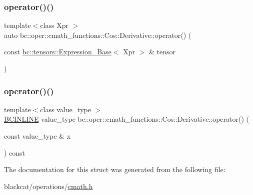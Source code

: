 \mbox{\label{structbc_1_1oper_1_1cmath__functions_1_1Cos_1_1Derivative_a5a9d6f6ab7a0dd71443573bbd4f87ba5}} 
\subsubsection{\texorpdfstring{operator()()}{operator()()}\hspace{0.1cm}{\footnotesize\ttfamily [2/3]}}
{\footnotesize\ttfamily template$<$class Xpr $>$ \\
auto bc\+::oper\+::cmath\+\_\+functions\+::\+Cos\+::\+Derivative\+::operator() (\begin{DoxyParamCaption}\item[{const \hyperlink{classbc_1_1tensors_1_1Expression__Base}{bc\+::tensors\+::\+Expression\+\_\+\+Base}$<$ Xpr $>$ \&}]{tensor }\end{DoxyParamCaption})\hspace{0.3cm}{\ttfamily [inline]}}

\mbox{\label{structbc_1_1oper_1_1cmath__functions_1_1Cos_1_1Derivative_a50b68714264376c97f257c339c994fbe}} 
\subsubsection{\texorpdfstring{operator()()}{operator()()}\hspace{0.1cm}{\footnotesize\ttfamily [3/3]}}
{\footnotesize\ttfamily template$<$class value\+\_\+type $>$ \\
\hyperlink{common_8h_a6699e8b0449da5c0fafb878e59c1d4b1}{B\+C\+I\+N\+L\+I\+NE} value\+\_\+type bc\+::oper\+::cmath\+\_\+functions\+::\+Cos\+::\+Derivative\+::operator() (\begin{DoxyParamCaption}\item[{const value\+\_\+type \&}]{x }\end{DoxyParamCaption}) const\hspace{0.3cm}{\ttfamily [inline]}}



The documentation for this struct was generated from the following file\+:\begin{DoxyCompactItemize}
\item 
blackcat/operations/\hyperlink{cmath_8h}{cmath.\+h}\end{DoxyCompactItemize}
